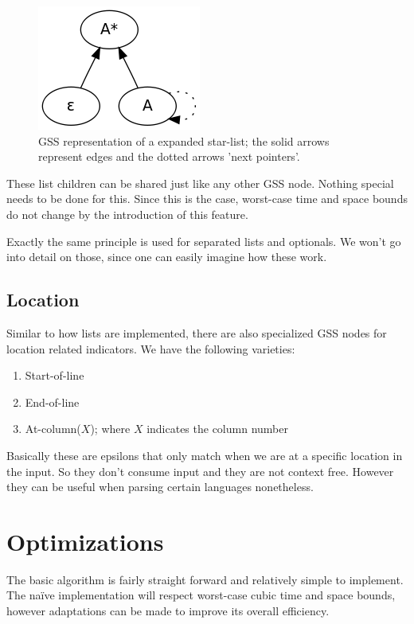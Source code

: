 \documentclass[a4paper,10pt]{article}
\begin{document}
\begin{figure}[H]
\centering
\includegraphics[scale=0.5]{star-list.png}
\caption{GSS representation of a expanded star-list; the solid arrows represent edges and the dotted arrows 'next pointers'.}
\end{figure}

These list children can be shared just like any other GSS node. Nothing special needs to be done for this. Since this is the case, worst-case time and space bounds do not change by the introduction of this feature.

Exactly the same principle is used for separated lists and optionals. We won't go into detail on those, since one can easily imagine how these work.

\subsection{Location}

Similar to how lists are implemented, there are also specialized GSS nodes for location related indicators. We have the following varieties:
\begin{enumerate}
 \setlength{\itemsep}{0pt}
 \setlength{\parskip}{0pt}
 \setlength{\parsep}{0pt}
 
 \item Start-of-line
 \item End-of-line
 \item At-column($X$); where $X$ indicates the column number
\end{enumerate}
Basically these are epsilons that only match when we are at a specific location in the input. So they don't consume input and they are not context free. However they can be useful when parsing certain languages nonetheless.

\section{Optimizations}

The basic algorithm is fairly straight forward and relatively simple to implement. The naïve implementation will respect worst-case cubic time and space bounds, however adaptations can be made to improve its overall efficiency.
\end{document}
